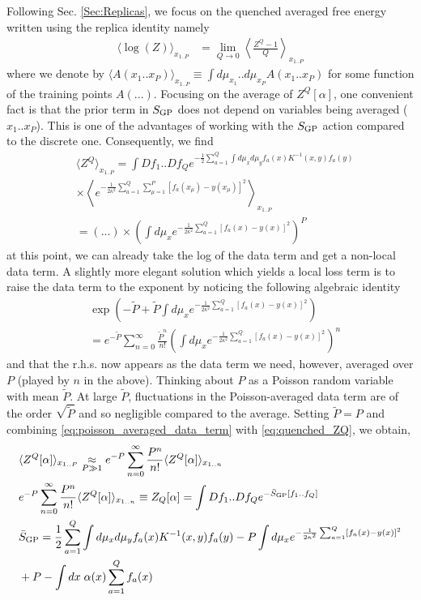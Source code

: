Following Sec. \ref{Sec:Replicas}, we focus on the quenched averaged free energy written using the replica identity namely 
\begin{align}
\label{Eq:ReplicatedZGPR}
\langle \log(Z) \rangle_{x_{1..P}} &= \lim_{Q\to 0}\left\langle \frac{Z^Q-1}{Q} \right\rangle_{x_{1..P}} 
\end{align}
where we denote by $\langle A(x_1..x_P) \rangle_{x_{1..P}} \equiv \int d\mu_{x_1}..d\mu_{x_P} A(x_1..x_P)$ for some function of the training points $A(...)$. Focusing on the average of $Z^Q[\alpha]$, one convenient fact is that the prior term in $S_{\text{GP}}$ does not depend on variables being averaged ($x_1..x_P$). This is one of the advantages of working with the $S_{\text{GP}}$ action compared to the discrete one.  Consequently, we find 
\begin{align}
\label{eq:quenched_ZQ}
&\langle Z^Q\rangle_{x_{1..P}} = \int D f_1..Df_Q e^{-\frac{1}{2} \sum_{a=1}^Q \int d\mu_x d\mu_y f_a(x) K^{-1}(x,y) f_a(y)}  \\ \nonumber 
&\times \left\langle e^{-\frac{1}{2\kappa^2}\sum_{a=1}^Q \sum_{\mu=1}^P [f_a(x_{\mu})-y(x_{\mu})]^2}\right\rangle_{x_{1..P}} \\ \nonumber 
&= (...)\times \left(\int d\mu_x e^{-\frac{1}{2\kappa^2}\sum_{a=1}^Q [f_a(x)-y(x)]^2}\right)^P 
\end{align}
at this point, we can already take the log of the data term and get a non-local data term. A slightly more elegant solution which yields a local loss term is to raise the data term to the exponent by noticing the following algebraic identity   
\begin{align}
\label{eq:poisson_averaged_data_term}
&\exp\left(-\tilde{P}+\tilde{P} \int d\mu_x e^{-\frac{1}{2\kappa^2}\sum_{a=1}^Q [f_a(x)-y(x)]^2}\right) \\ \nonumber 
&= e^{-\tilde{P}}\sum_{n=0}^{\infty} \frac{\tilde{P}^n}{n!} \left(\int d\mu_x e^{-\frac{1}{2\kappa^2}\sum_{a=1}^Q [f_a(x)-y(x)]^2}\right)^n
\end{align}
and that the r.h.s. now appears as the data term we need, however, averaged over $P$ (played by $n$ in the above). Thinking about $P$ as a Poisson random variable with mean $\tilde{P}$. At large $\tilde{P}$, fluctuations in the Poisson-averaged data term are of the order $\sqrt{\tilde{P}}$ and so negligible compared to the average. Setting $\tilde{P}=P$ and combining \ref{eq:poisson_averaged_data_term} with \ref{eq:quenched_ZQ}, we obtain, 
\begin{align}
\label{Eq:IntroducingSBar}
&\langle Z^Q[\alpha]\rangle_{x_{1..P}} \underset{P \gg 1}{\approx} e^{-P}\sum_{n=0}^{\infty} \frac{P^n}{n!} \langle Z^Q[\alpha]\rangle_{x_{1..n}} \\ \nonumber 
&e^{-P}\sum_{n=0}^{\infty} \frac{P^n}{n!} \langle Z^Q[\alpha]\rangle_{x_{1..n}} \equiv Z_Q[\alpha] = \int Df_1..Df_Q e^{-\bar{S}_{\text{GP}}[f_1..f_Q]} \\ \nonumber 
&\bar{S}_{\text{GP}} = \frac{1}{2} \sum_{a=1}^Q \int d\mu_x d\mu_y f_a(x) K^{-1}(x,y) f_a(y) - P \int d\mu_x e^{-\frac{1}{2\kappa^2}\sum_{a=1}^Q [f_a(x)-y(x)]^2} \\ \nonumber 
&+ P - \int dx \; \alpha(x) \sum_{a=1}^Q f_a(x)
\end{align}
